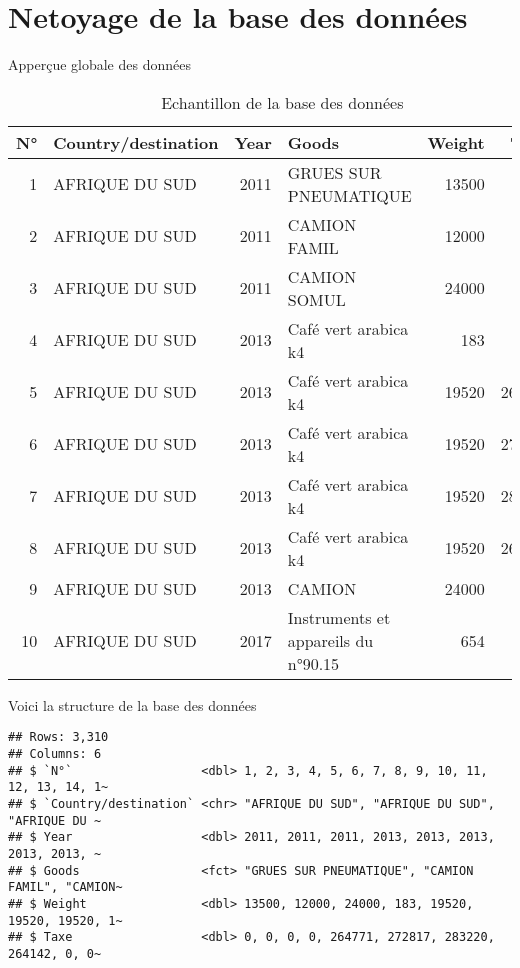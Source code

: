 \documentclass[
]{book}
\begin{document}
\hypertarget{netoyage-de-la-base-des-donnuxe9es}{%
\section{Netoyage de la base des données}\label{netoyage-de-la-base-des-donnuxe9es}}

Apperçue globale des données

\begin{table}

\caption{\label{tab:unnamed-chunk-2}Echantillon de la base des données}
\centering
\begin{tabular}[t]{r|l|r|l|r|r}
\hline
N° & Country/destination & Year & Goods & Weight & Taxe\\
\hline
1 & AFRIQUE DU SUD & 2011 & GRUES SUR PNEUMATIQUE & 13500 & 0\\
\hline
2 & AFRIQUE DU SUD & 2011 & CAMION FAMIL & 12000 & 0\\
\hline
3 & AFRIQUE DU SUD & 2011 & CAMION SOMUL & 24000 & 0\\
\hline
4 & AFRIQUE DU SUD & 2013 & Café vert arabica k4 & 183 & 0\\
\hline
5 & AFRIQUE DU SUD & 2013 & Café vert arabica k4 & 19520 & 264771\\
\hline
6 & AFRIQUE DU SUD & 2013 & Café vert arabica k4 & 19520 & 272817\\
\hline
7 & AFRIQUE DU SUD & 2013 & Café vert arabica k4 & 19520 & 283220\\
\hline
8 & AFRIQUE DU SUD & 2013 & Café vert arabica k4 & 19520 & 264142\\
\hline
9 & AFRIQUE DU SUD & 2013 & CAMION & 24000 & 0\\
\hline
10 & AFRIQUE DU SUD & 2017 & Instruments et appareils du n°90.15 & 654 & 0\\
\hline
\end{tabular}
\end{table}

Voici la structure de la base des données

\begin{verbatim}
## Rows: 3,310
## Columns: 6
## $ `N°`                  <dbl> 1, 2, 3, 4, 5, 6, 7, 8, 9, 10, 11, 12, 13, 14, 1~
## $ `Country/destination` <chr> "AFRIQUE DU SUD", "AFRIQUE DU SUD", "AFRIQUE DU ~
## $ Year                  <dbl> 2011, 2011, 2011, 2013, 2013, 2013, 2013, 2013, ~
## $ Goods                 <fct> "GRUES SUR PNEUMATIQUE", "CAMION FAMIL", "CAMION~
## $ Weight                <dbl> 13500, 12000, 24000, 183, 19520, 19520, 19520, 1~
## $ Taxe                  <dbl> 0, 0, 0, 0, 264771, 272817, 283220, 264142, 0, 0~
\end{verbatim}
\end{document}
